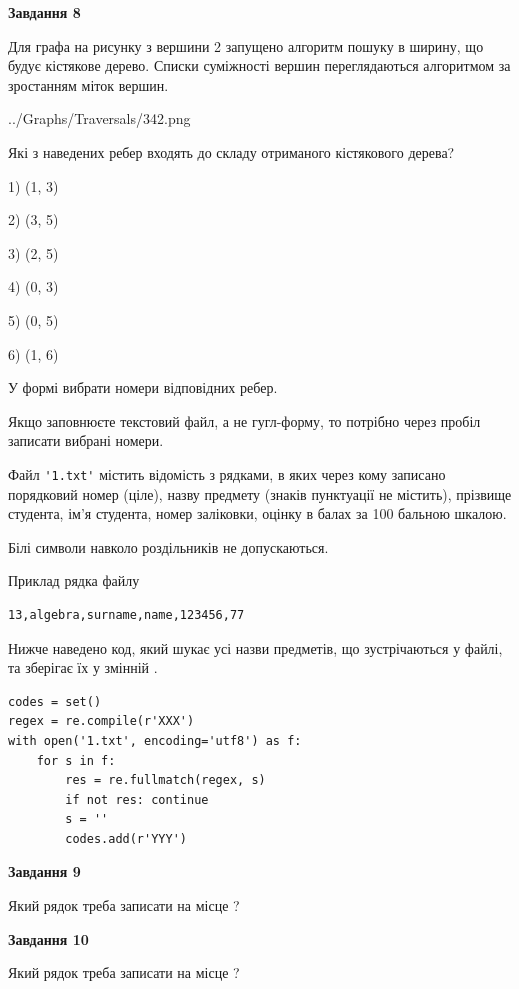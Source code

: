 \documentclass[12pt, ukrainian]{article}
\def\code#1{\Verb!#1!}
\begin{document}
{\begin {large}
{\begin {center}\textbf{Завдання 8}\end {center}}\par
Для графа на рисунку з вершини 2 запущено алгоритм пошуку в ширину, що будує кістякове дерево. Списки суміжності вершин переглядаються алгоритмом за зростанням міток вершин.\par
\begin{center}
	{../Graphs/Traversals/342.png}
\end{center}
\par Які з наведених ребер входять до складу отриманого кістякового дерева?\par
1) (1, 3)\par
2) (3, 5)\par
3) (2, 5)\par
4) (0, 3)\par
5) (0, 5)\par
6) (1, 6)\par
{\vskip 15pt} У формі вибрати номери відповідних ребер.


Якщо заповнюєте текстовий файл, а не гугл-форму, то потрібно через пробіл записа\-ти вибрані номери.\par
\newpage


Файл \code{'1.txt'} містить відомість з рядками, в яких через кому записано поряд\-ковий номер (ціле), назву предмету (знаків пунктуації не містить), прізвище студента, ім'я студента, номер заліковки, оцінку в балах за 100 бальною шкалою.

Білі символи навколо роздільників не допускаються.

Приклад рядка файлу



\begin{verbatim}
13,algebra,surname,name,123456,77
\end{verbatim}


Нижче наведено код, який шукає усі назви предметів, що зустрічаються у файлі, та зберігає їх у змінній .



\begin{verbatim}
codes = set()
regex = re.compile(r'XXX')
with open('1.txt', encoding='utf8') as f:
    for s in f:
        res = re.fullmatch(regex, s)
        if not res: continue
        s = ''
        codes.add(r'YYY')
\end{verbatim}


{\begin {center}\textbf{Завдання 9}\end {center}}\par
Який рядок треба записати на місце  ?\par
\vspace{5mm}


{\begin {center}\textbf{Завдання 10}\end {center}}\par
Який рядок треба записати на місце  ?\par


\newpage


\end {large}}
\end{document}
